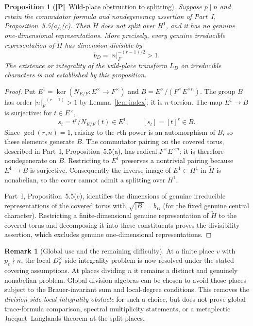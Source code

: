 \documentclass[11pt]{article}
\newcommand{\tH}{\widetilde H}
\newcommand{\Ptag}{\textnormal{\textbf{[P]}}}
\theoremstyle{plain}
\newtheorem{proposition}[theorem]{Proposition}
\theoremstyle{definition}
\newtheorem{remark}[theorem]{Remark}
\begin{document}
\begin{proposition}[\Ptag\ Wild-place obstruction to splitting]\label{prop:wild-obstruction}
Suppose $p\mid n$ and retain the commutator formula and
nondegeneracy assertion of Part~I, Proposition~5.5(a),(c).
Then $\tH$ does not split over $H^1$, and it has no genuine
one-dimensional representations. More precisely, every genuine irreducible
representation of $\tH$ has dimension divisible by
\[
 b_D=|n|_F^{-(r-1)/2}>1.
\]
The existence or integrality of the wild-place transform $L_D$
on irreducible characters is not established by this proposition.
\end{proposition}
\begin{proof}
Put $E^1=\ker(N_{E/F}:E^\times\to F^\times)$ and
$B=E^\times/(F^\times E^{\times n})$. The group $B$ has
order $|n|_F^{-(r-1)}>1$ by Lemma~\ref{lem:index}; it is
$n$-torsion. The map $E^1\to B$ is surjective: for $t\in E^\times$,
\[
 s_t=t^r/N_{E/F}(t)\in E^1,
\qquad [s_t]=[t]^r\in B.
\]
Since $\gcd(r,n)=1$, raising to the $r$th power is an
automorphism of $B$, so these elements generate $B$.
The commutator pairing on the covered torus, described in
Part~I, Proposition~5.5(a), has radical
$F^\times E^{\times n}$; it is therefore nondegenerate on
$B$. Restricting to $E^1$ preserves a nontrivial pairing
because $E^1\to B$ is surjective. Consequently the
inverse image of $E^1\subset H^1$ in $\tH$ is nonabelian,
so the cover cannot admit a splitting over $H^1$.

Part~I, Proposition~5.5(c), identifies the dimensions of
genuine irreducible representations of the covered torus
with $\sqrt{|B|}=b_D$ (for the fixed genuine central
character). Restricting a finite-dimensional genuine
representation of $\tH$ to the covered torus and decomposing
it into these constituents proves the divisibility assertion,
which excludes genuine one-dimensional representations.
\end{proof}

\begin{remark}[Global use and the remaining difficulty]\label{rem:global-tame}
At a finite place $v$ with $p_v\nmid n$, the local
$D_v^\times$-side integrality problem is now resolved under
the stated covering assumptions. At places dividing $n$
it remains a distinct and genuinely nonabelian problem.
Global division algebras can be chosen to avoid those places
subject to the Brauer-invariant sum and local-degree
conditions. This removes the \emph{division-side local
integrality obstacle} for such a choice, but does not prove
global trace-formula comparison, spectral multiplicity
statements, or a metaplectic Jacquet--Langlands theorem
at the split places.
\end{remark}
\end{document}
